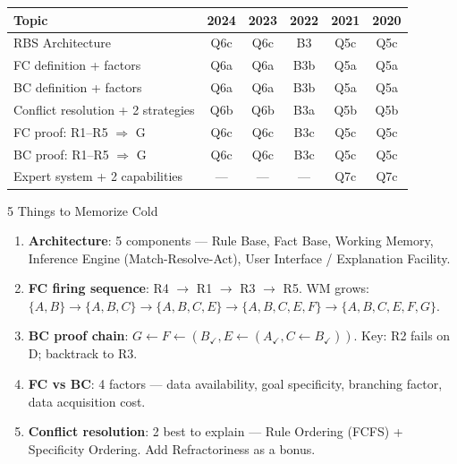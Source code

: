 \documentclass[12pt,a4paper]{article}
\begin{document}
\begin{center}
\renewcommand{\arraystretch}{1.3}
\begin{tabular}{p{6.5cm} ccccc}
\toprule
\textbf{Topic} & \textbf{2024} & \textbf{2023} & \textbf{2022} & \textbf{2021} & \textbf{2020} \\
\midrule
RBS Architecture & Q6c & Q6c & B3 & Q5c & Q5c \\
FC definition + factors & Q6a & Q6a & B3b & Q5a & Q5a \\
BC definition + factors & Q6a & Q6a & B3b & Q5a & Q5a \\
Conflict resolution + 2 strategies & Q6b & Q6b & B3a & Q5b & Q5b \\
FC proof: R1--R5 $\Rightarrow$ G & Q6c & Q6c & B3c & Q5c & Q5c \\
BC proof: R1--R5 $\Rightarrow$ G & Q6c & Q6c & B3c & Q5c & Q5c \\
Expert system + 2 capabilities & --- & --- & --- & Q7c & Q7c \\
\bottomrule
\end{tabular}
\end{center}

\begin{keybox}{5 Things to Memorize Cold}
\begin{enumerate}
  \item \textbf{Architecture}: 5 components --- Rule Base, Fact Base, Working Memory,
        Inference Engine (Match-Resolve-Act), User Interface / Explanation Facility.
  \item \textbf{FC firing sequence}: R4 $\to$ R1 $\to$ R3 $\to$ R5.
        WM grows: $\{A,B\}\to\{A,B,C\}\to\{A,B,C,E\}\to\{A,B,C,E,F\}\to\{A,B,C,E,F,G\}$.
  \item \textbf{BC proof chain}: $G\leftarrow F\leftarrow(B_\checkmark, E\leftarrow(A_\checkmark, C\leftarrow B_\checkmark))$.
        Key: R2 fails on D; backtrack to R3.
  \item \textbf{FC vs BC}: 4 factors --- data availability, goal specificity,
        branching factor, data acquisition cost.
  \item \textbf{Conflict resolution}: 2 best to explain --- Rule Ordering (FCFS) +
        Specificity Ordering. Add Refractoriness as a bonus.
\end{enumerate}
\end{keybox}
\end{document}

